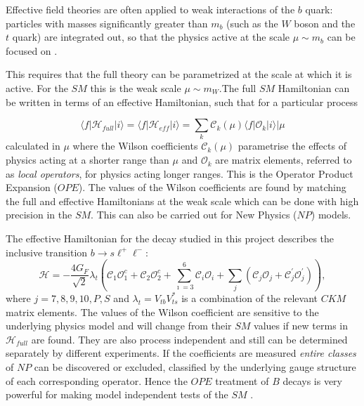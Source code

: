 \documentclass[a4paper,12pt]{article}
\begin{document}
Effective field theories are often applied to weak interactions of the $b$ quark: particles with masses significantly greater than $m_b$ (such as the $W$ boson and the $t$ quark) are integrated out, so that the physics active at the scale $\mu \sim m_b$ can be focused on \cite[p. 23]{paper1}. 

This requires that the full theory can be parametrized at the scale at which it is active. For the $SM$ this is the weak scale $\mu \sim m_W$.The full $SM$ Hamiltonian can be written in terms of an effective Hamiltonian, such that for a particular process 

\begin{equation}
\langle f | \mathcal{H}_{full} |i\rangle = \langle f | \mathcal{H}_{eff} |i\rangle = \sum_k \mathcal{C}_k \left  ( \mu\right ) \langle f | \mathcal{O}_k | i \rangle \rvert \mu
\end{equation}
 calculated in $\mu$ 
where the Wilson coefficients $\mathcal{C}_k  (\mu)$ parametrise the effects of physics acting at a shorter range than $\mu$ and $\mathcal{O}_k$ are matrix elements, referred to as {\it local operators}, for physics acting longer ranges. This is the Operator Product Expansion ($OPE$). The values of the Wilson coefficients are found by matching the full and effective Hamiltonians at the weak scale which can be done with high precision in the $SM$. This can also be carried out for New Physics ($NP$) models.

The effective Hamiltonian for the decay studied in this project describes the inclusive transition $b\rightarrow s\ell^+\ell^-$: 
\begin{equation}\label{projecthamiltonian}
\mathcal {H} = -\frac{4G_F}{\sqrt 2}\lambda_t \left ( \mathcal {C}_1\mathcal O_1^c + \mathcal C_2\mathcal O_2^c + \sum_{\imath = 3}^{6}\mathcal C_i\mathcal O_i + \sum_j (\mathcal C_j\mathcal O_j + \mathcal C_j^{\mathcal '}\mathcal O_j^{\mathcal '} ) \right ),
\end{equation}
where $j = 7,8,9,10,P,S$ and $\lambda_t = V_{tb} V^{\ast}_{ts}$ is a combination of the relevant $CKM$ matrix elements. 
The values of the Wilson coefficient are sensitive to the underlying physics model and will change from their $SM$ values if new terms in $\mathcal{H}_{full}$ are found. They are also process independent and still can be determined separately by different experiments. If the coefficients are measured  {\it entire classes} of $NP$ can be discovered or excluded, classified by the underlying gauge structure of each corresponding operator. Hence the $OPE$ treatment of $B$ decays is very powerful for making model independent tests of the $SM$ \cite[p. 23]{paper1}. 
\end{document}

